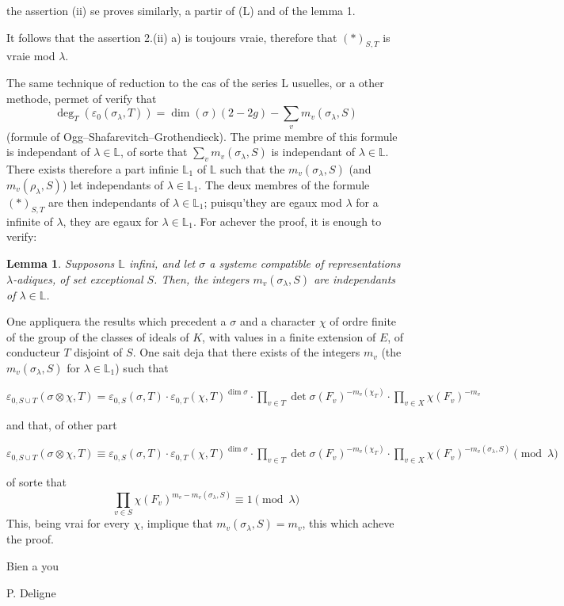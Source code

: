 \documentclass[11pt,a4paper]{article}
\theoremstyle{plain}
\newtheorem{lemma}[theorem]{Lemma}
\begin{document}
the assertion (ii) se proves similarly, a partir of (L) and of the lemma 1.

It follows that the assertion 2.(ii) a) is toujours vraie, therefore that $(*)_{S,T}$ is vraie mod $\lambda$.

\newpage

The same technique of reduction to the cas of the series L usuelles, or a other methode, permet of verify that
\[
\deg_T(\varepsilon_0(\sigma_\lambda, T)) = \dim(\sigma)(2 - 2g) - \sum_v m_v(\sigma_\lambda, S)
\]
(formule of Ogg--Shafarevitch--Grothendieck). The prime membre of this formule is independant of $\lambda \in \mathbb{L}$, of sorte that $\sum_v m_v(\sigma_\lambda, S)$ is independant of $\lambda \in \mathbb{L}$. There exists therefore a part infinie $\mathbb{L}_1$ of $\mathbb{L}$ such that the $m_v(\sigma_\lambda, S)$ (and $m_v(\rho_\lambda, S)$) let independants of $\lambda \in \mathbb{L}_1$. The deux membres of the formule $(*)_{S,T}$ are then independants of $\lambda \in \mathbb{L}_1$; puisqu'they are egaux mod $\lambda$ for a infinite of $\lambda$, they are egaux for $\lambda \in \mathbb{L}_1$. For achever the proof, it is enough to verify:

\begin{lemma}
Supposons $\mathbb{L}$ infini, and let $\sigma$ a systeme compatible of representations $\lambda$-adiques, of set exceptional $S$. Then, the integers $m_v(\sigma_\lambda, S)$ are independants of $\lambda \in \mathbb{L}$.
\end{lemma}

One appliquera the results which precedent a $\sigma$ and a character $\chi$ of ordre finite of the group of the classes of ideals of $K$, with values in a finite extension of $E$, of conducteur $T$ disjoint of $S$. One sait deja that there exists of the integers $m_v$ (the $m_v(\sigma_\lambda, S)$ for $\lambda \in \mathbb{L}_1$) such that

$\varepsilon_{0,S \cup T}(\sigma \otimes \chi, T) = \varepsilon_{0,S}(\sigma, T) \cdot \varepsilon_{0,T}(\chi, T)^{\dim \sigma} \cdot \prod_{v \in T} \det \sigma(F_v)^{-m_v(\chi_T)} \cdot \prod_{v \in X} \chi(F_v)^{-m_v}$

and that, of other part

$\varepsilon_{0,S \cup T}(\sigma \otimes \chi, T) \equiv \varepsilon_{0,S}(\sigma, T) \cdot \varepsilon_{0,T}(\chi, T)^{\dim \sigma} \cdot \prod_{v \in T} \det \sigma(F_v)^{-m_v(\chi_T)} \cdot \prod_{v \in X} \chi(F_v)^{-m_v(\sigma_\lambda, S)} \pmod{\lambda}$

of sorte that
\[
\prod_{v \in S} \chi(F_v)^{m_v - m_v(\sigma_\lambda, S)} \equiv 1 \pmod{\lambda}
\]
This, being vrai for every $\chi$, implique that $m_v(\sigma_\lambda, S) = m_v$, this which acheve the proof.

\vspace{1cm}

\begin{flushright}
Bien a you

\vspace{0.5cm}

P. Deligne
\end{flushright}
\end{document}
